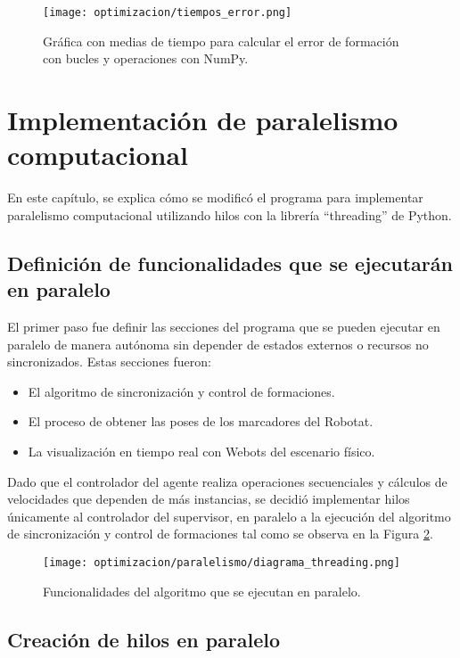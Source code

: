 \begin{figure}[H]
	\centering
	\texttt{[image: optimizacion/tiempos\_error.png]}
	\caption{Gráfica con medias de tiempo para calcular el error de formación con bucles y operaciones con NumPy.}
	\label{fig:grafica_tiempos_error}
\end{figure}

\section{Implementación de paralelismo computacional}
En este capítulo, se explica cómo se modificó el programa para implementar paralelismo computacional utilizando hilos con la librería ``threading'' de Python.

\subsection{Definición de funcionalidades que se ejecutarán en paralelo}
El primer paso fue definir las secciones del programa que se pueden ejecutar en paralelo de manera autónoma sin depender de estados externos o recursos no sincronizados. Estas secciones fueron:
\begin{itemize}
	\item El algoritmo de sincronización y control de formaciones.
	\item El proceso de obtener las poses de los marcadores del Robotat.
	\item La visualización en tiempo real con Webots del escenario físico.
\end{itemize}

Dado que el controlador del agente realiza operaciones secuenciales y cálculos de velocidades que dependen de más instancias, se decidió implementar hilos únicamente al controlador del supervisor, en paralelo a la ejecución del algoritmo de sincronización y control de formaciones tal como se observa en la Figura \ref{fig:hilos}.

\begin{figure}[H]
	\centering
	\texttt{[image: optimizacion/paralelismo/diagrama\_threading.png]}
	\caption{Funcionalidades del algoritmo que se ejecutan en paralelo.}
	\label{fig:hilos}
\end{figure}

\subsection{Creación de hilos en paralelo}

